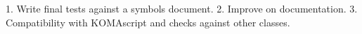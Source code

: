 1. Write final tests against a symbols document.
2. Improve on documentation.
3. Compatibility with KOMAscript and checks against other classes.
\wlog{*******************************}
\wlog{*******************************}
